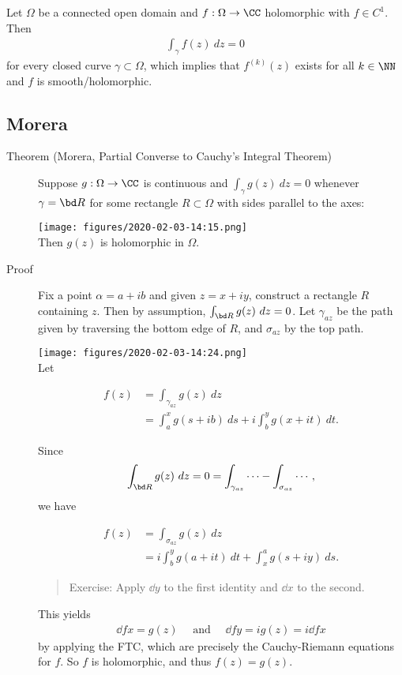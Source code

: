 Let \(\Omega\) be a connected open domain and \(f: \Omega \to \CC\)
holomorphic with \(f\in C^1\). Then
\begin{align*}\int_\gamma f(z) ~dz = 0\end{align*} for every closed
curve \(\gamma \subset \Omega\), which implies that \(f^{(k)} (z)\)
exists for all \(k\in \NN\) and \(f\) is smooth/holomorphic.

\hypertarget{morera}{%
\subsection{Morera}\label{morera}}

\begin{description}
\item[Theorem (Morera, Partial Converse to Cauchy's Integral Theorem)]
Suppose \(g: \Omega \to \CC\) is continuous and
\(\int_\gamma g(z)~dz = 0\) whenever \(\gamma = \bd R\) for some
rectangle \(R\subset \Omega\) with sides parallel to the axes:

\texttt{[image: figures/2020-02-03-14:15.png]}\\

Then \(g(z)\) is holomorphic in \(\Omega\).
\item[Proof]
Fix a point \(\alpha = a + ib\) and given \(z = x+iy\), construct a
rectangle \(R\) containing \(z\). Then by assumption,
\(\int_{\bd R} g(z) ~dz = 0\). Let \(\gamma_{az}\) be the path given by
traversing the bottom edge of \(R\), and \(\sigma_{az}\) by the top
path.

\texttt{[image: figures/2020-02-03-14:24.png]}\\

Let

\begin{align*}
f(z)
&= \int_{\gamma_{az} } g(z) ~dz \\
&= \int_a^x g(s+ib) ~ds + i \int_b^y g(x+it) ~dt
.\end{align*}

Since
\begin{align*}\int_{\bd R} g(z) ~dz = 0 = \int_{\gamma_{az}} \cdots - \int_{\sigma_{az}} \cdots,\end{align*}
we have

\begin{align*}
f(z) 
&= \int_{\sigma_{az}} g(z) ~dz \\
&= i \int_b^y g(a + it) ~dt + \int_x^a g(s + iy) ~ds
.\end{align*}

\begin{quote}
Exercise: Apply \(\dd{}{y}\) to the first identity and \(\dd{}{x}\) to
the second.
\end{quote}

This yields
\begin{align*}\dd{f}{x} = g(z) \quad\text{ and }\quad \dd{f}{y} = ig(z) = i \dd{f}{x}\end{align*}
by applying the FTC, which are precisely the Cauchy-Riemann equations
for \(f\). So \(f\) is holomorphic, and thus \(f(z) = g(z)\).
\end{description}

